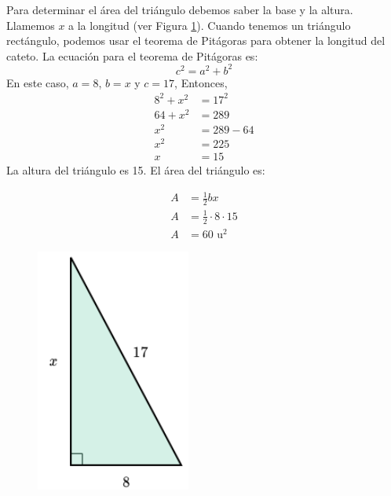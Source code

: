 \begin{solutionbox}{13cm}

    \begin{minipage}{0.6\textwidth}
        Para determinar el área del triángulo debemos saber la base y la altura. Llamemos $x$ a la longitud (ver Figura \ref{fig:area_rectangulo_02a}).
        Cuando tenemos un triángulo rectángulo, podemos usar el teorema de Pitágoras para obtener la longitud del cateto.
        La ecuación para el teorema de Pitágoras es:
        \[c^2=a^2+b^2\]
        En este caso, $a=8$, $b=x$ y $c=17$, Entonces,
        \begin{align*}
            8^2+x^2 & =17^2   \\
            64+x^2  & =289    \\
            x^2     & =289-64 \\
            x^2     & =225    \\
            x       & =15
        \end{align*}
        La altura del triángulo es 15. El área del triángulo es:

        \begin{align*}
            A & =\frac{1}{2}bx              \\
            A & =\frac{1}{2}\cdot 8\cdot 15 \\
            A & =60 \text{ u}^2
        \end{align*}
    \end{minipage}\hfill
    \begin{minipage}{0.35\textwidth}
        \begin{figure}[H]
            \centering
            \includegraphics[width=0.5\linewidth]{../images/area_rectangulo_02a.png}
            \caption{}
            \label{fig:area_rectangulo_02a}
        \end{figure}
    \end{minipage}
\end{solutionbox}
